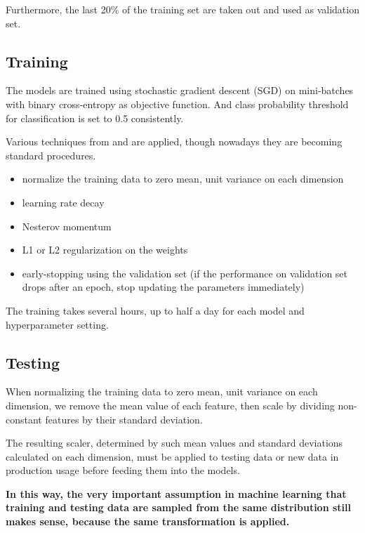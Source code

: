 \documentclass[11pt,a4paper,titlepage]{article}
\begin{document}
Furthermore, the last 20\% of the training set are taken out and used as validation set.

\subsection{Training}

The models are trained using stochastic gradient descent (SGD) on mini-batches with binary cross-entropy as objective function.
And class probability threshold for classification is set to 0.5 consistently.

Various techniques from \cite{lecun2012efficient} and \cite{orr2003neural} are applied, though nowadays they are becoming standard procedures.

\begin{itemize}
  \item normalize the training data to zero mean, unit variance on each dimension
  \item learning rate decay
  \item Nesterov momentum \cite{nesterov1983method}
  \item L1 or L2 regularization on the weights
  \item early-stopping using the validation set (if the performance on validation set drops after an epoch, stop updating the parameters immediately)
\end{itemize}

The training takes several hours, up to half a day for each model and hyperparameter setting.

\subsection{Testing}

When normalizing the training data to zero mean, unit variance on each dimension, we remove the mean value of each feature, then scale by dividing non-constant features by their standard deviation.

The resulting scaler, determined by such mean values and standard deviations calculated on each dimension, must be applied to testing data or new data in production usage before feeding them into the models.

\bigskip

\textbf{In this way, the very important assumption in machine learning that training and testing data are sampled from the same distribution still makes sense, because the same transformation is applied.}
\end{document}
